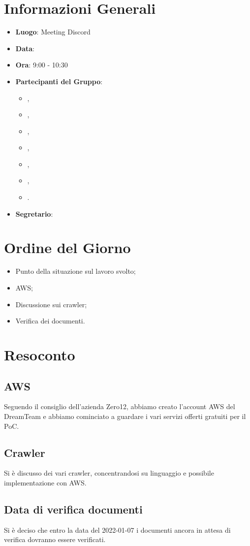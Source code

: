 \section{Informazioni Generali}

\begin{itemize}
\item{\textbf{Luogo}}: Meeting Discord
\item{\textbf{Data}}: \D{}
\item{\textbf{Ora}}: 9:00 - 10:30
\item{\textbf{Partecipanti del Gruppo}}: 
	\begin{itemize}
	\item{\EP{},} 
	\item{\FP{},}
	\item{\GC{},}
	\item{\LW{},}
	\item{\MB{},}
	\item{\MG{},}
	\item{\PV{}.}
	\end{itemize} 
\item{\textbf{Segretario}}: \PV{}	
\end{itemize}

\section{Ordine del Giorno}
\begin{itemize}
\item{Punto della situazione sul lavoro svolto;}
\item{AWS;}
\item{Discussione sui crawler;}
\item{Verifica dei documenti.}
\end{itemize}

\section{Resoconto}

\subsection{AWS}
Seguendo il consiglio dell'azienda Zero12, abbiamo creato l'account AWS del DreamTeam e abbiamo cominciato a guardare i vari servizi offerti gratuiti per il PoC.

\subsection{Crawler}
Si è discusso dei vari crawler, concentrandosi su linguaggio e possibile implementazione con AWS.

\subsection{Data di verifica documenti}
Si è deciso che entro la data del 2022-01-07 i documenti ancora in attesa di verifica dovranno essere verificati.
